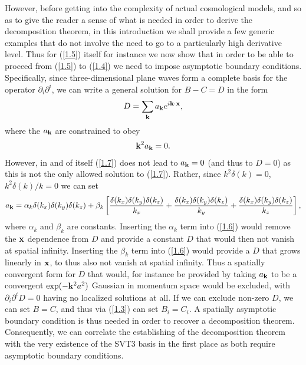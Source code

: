 \documentclass[aps,onecolumn,10pt]{revtex4}
\numberwithin{equation}{section}
\numberwithin{equation}{section}
\begin{document}
However, before getting into the complexity of actual cosmological models, and so as to give the reader a sense of what is needed in order to derive the decomposition theorem, in this introduction we shall provide a few generic examples that do not involve the need to go to a particularly high derivative level. Thus for (\ref{1.5}) itself for instance we now show that in order to be able to proceed from (\ref{1.5}) to (\ref{1.4}) we need to impose asymptotic boundary conditions. Specifically, since three-dimensional plane waves form a complete basis for the operator $\partial_i\partial^i$, we can write a general solution for $B-C=D$ in the form
%
\begin{eqnarray}
D=\sum _{\bf k}a_{\bf k}e^{i\textbf{k}\cdot \textbf{x}},
\label{1.6}
\end{eqnarray}
%
where the $a_{\bf k}$ are constrained to obey 
%
\begin{eqnarray}
{\bf k}^2a_{\bf k}=0.
\label{1.7}
\end{eqnarray}
%
However, in and of itself (\ref{1.7}) does not lead to $a_{\bf k}=0$ (and thus to $D=0$) as this is not the only allowed solution to (\ref{1.7}). Rather, since $k^2\delta(k)=0$, $k^2\delta(k)/k=0$ we can set
%
\begin{eqnarray}
a_{\bf k}=\alpha_k\delta(k_x)\delta(k_y)\delta(k_z) +\beta_k\left[\frac{\delta (k_x)\delta (k_y)\delta (k_z)}{k_x}+\frac{\delta (k_x)\delta (k_y)\delta (k_z)}{k_y}+\frac{\delta (k_x)\delta (k_y)\delta (k_z)}{k_z}\right],
\label{1.8}
\end{eqnarray}
%
where $\alpha_k$ and $\beta_k$ are constants. Inserting the $\alpha_k$ term  into (\ref{1.6}) would remove the ${\bf x}$ dependence from $D$ and provide a constant $D$ that would then not vanish at spatial infinity. Inserting the $\beta_k$ term  into (\ref{1.6}) would provide a $D$ that grows linearly in ${\bf x}$, to thus also not vanish at spatial infinity. Thus a spatially convergent  form for $D$ that would, for instance  be provided by taking  $a_{\bf k}$ to be a convergent $\exp(-{\bf k}^2a^2)$ Gaussian in momentum space would be excluded, with  $\partial_i\partial^iD=0$ having no localized solutions at all. If we can exclude non-zero $D$, we can set $B=C$, and thus via (\ref{1.3})  can set $B_i=C_i$.  A spatially asymptotic boundary condition is thus needed in order to recover a decomposition theorem. Consequently, we can correlate the establishing of the decomposition theorem with the very existence of the SVT3 basis in the first place as both require asymptotic boundary conditions.
\end{document}
